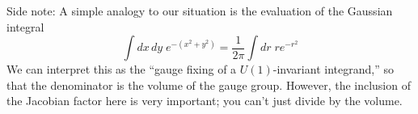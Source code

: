 Side note:
A simple analogy to our situation is the evaluation of the Gaussian integral
\[
\int dx\,dy\; e^{-(x^2 + y^2)} = \frac{1}{2\pi} \int dr \; r e^{-r^2}
\]
We can interpret this as the ``gauge fixing of a $U(1)$-invariant integrand,'' so that the denominator is the volume of the gauge group.
However, the inclusion of the Jacobian factor here is very important; you can't just divide by the volume.
